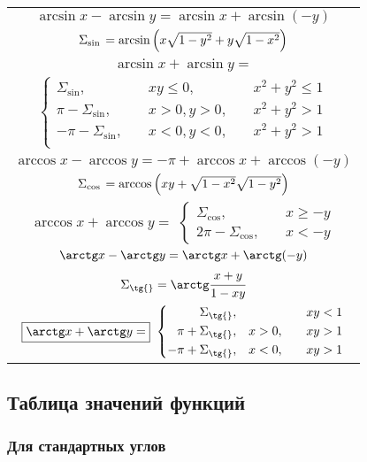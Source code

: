 {\renewcommand{\arraystretch}{1.5}
\begin{tabular}[t]{||c||}
	\hline
		$ \arcsin x - \arcsin y =  \arcsin x + \arcsin(-y) $ \\
		$ \Sigma_{\sin{}} = \arcsin\left(x\sqrt{\mathstrut 1-y^2}+y\sqrt{\mathstrut 1-x^2}\right) $ \\
	\hline
		$ \boxed{\arcsin x + \arcsin y =} $ \\
		$ \left\{ \begin{aligned}
			\Sigma_{\sin{}}, \quad & xy \leqslant 0,\quad & x^2 + y^2 \leqslant 1 \\
			\pi-\Sigma_{\sin{}}, \quad & x > 0, y > 0,\quad  & x^2 + y^2 > 1 \\
			-\pi-\Sigma_{\sin{}}, \quad & x < 0, y < 0,\quad & x^2 + y^2 > 1 \\
		\end{aligned} \right. $ \\
	\hline
	\hline
		$ \arccos x - \arccos y =  -\pi + \arccos x + \arccos(-y) $ \\
		$ \Sigma_{\cos{}} = \arccos\left(xy+\sqrt{\mathstrut 1-x^2}\sqrt{\mathstrut 1-y^2}\right) $ \\
	\hline
		$ \boxed{\arccos x + \arccos y =} $
		$ \left\{ \begin{aligned}
			\Sigma_{\cos{}}, \quad & x \geqslant -y \\
			2\pi-\Sigma_{\cos{}}, \quad & x < -y
		\end{aligned} \right. $ \\
	\hline
	\hline
		$ \arctg x - \arctg y =  \arctg x + \arctg(-y) $ \\
		$ \Sigma_{\tg{}} = \arctg\cfrac{x+y}{1-xy} $ \\
	\hline
		$ \boxed{\arctg x + \arctg y =} $
		$ \left\{ \begin{aligned}
			\Sigma_{\tg{}}, \quad & & xy < 1 \\
			\pi+\Sigma_{\tg{}}, \quad & x > 0, \quad & xy>1 \\
			-\pi+\Sigma_{\tg{}}, \quad & x < 0, \quad & xy>1 \\
		\end{aligned} \right. $ \\
	\hline
\end{tabular}}

\subsection{Таблица значений функций}

\subsubsection{Для стандартных углов}

